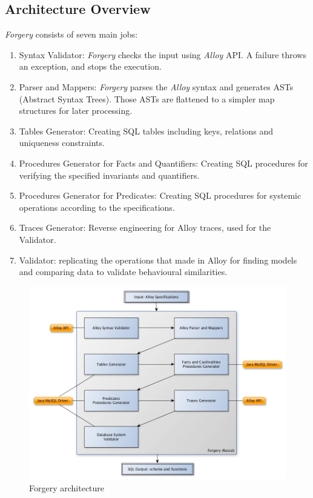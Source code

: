 \documentclass[oneside]{book}
\begin{document}
\subsection{Architecture Overview}
\textit{Forgery} consists of seven main jobs:
\begin{enumerate}
	\item Syntax Validator: \textit{Forgery} checks the input using \textit{Alloy} API. A failure throws an exception, and stops the execution.
	\item Parser and Mappers: \textit{Forgery} parses the \textit{Alloy} syntax and generates ASTs (Abstract Syntax Trees). Those ASTs are flattened to a simpler map structures for later processing.
	\item Tables Generator: Creating SQL tables including keys, relations and uniqueness constraints.
	\item Procedures Generator for Facts and Quantifiers: Creating SQL procedures for verifying the specified invariants and quantifiers. 
	\item Procedures Generator for Predicates: Creating SQL procedures for systemic operations according to the specifications.
	\item Traces Generator: Reverse engineering for Alloy traces, used for the Validator.
	\item Validator: replicating the operations that made in Alloy for finding models and comparing data to validate behavioural similarities.
\end{enumerate}

\begin{figure}[h!]
\centering
\includegraphics[scale=0.5]{forgery}
\caption{Forgery architecture}
\end{figure}
\end{document}

